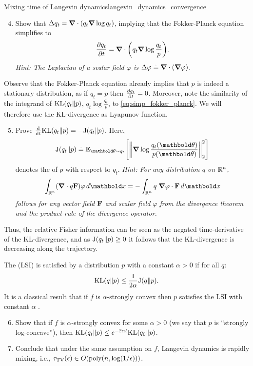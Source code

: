 \begin{nexercise}{Mixing time of Langevin dynamics}{langevin_dynamics_convergence}
  \begin{enumerate}
    \setcounter{enumi}{3}
    \item Show that $\lapl q_t = \dive (q_t \grad \log q_t)$, implying that the Fokker-Planck equation simplifies to \begin{align}
      \pdv{q_t}{t} = \dive \parentheses*{q_t \grad \log \frac{q_t}{p}}. \label{eq:simp_fokker_planck}
    \end{align}
    \textit{Hint: The Laplacian of a scalar field $\varphi$ is $\lapl \varphi \defeq \dive (\grad \varphi)$.}
  \end{enumerate}
  Observe that the Fokker-Planck equation already implies that $p$ is indeed a stationary distribution, as if $q_t = p$ then $\pdv{q_t}{t} = 0$.
  Moreover, note the similarity of the integrand of $\KL{q_t}{p}$, $q_t \log \frac{q_t}{p}$, to \cref{eq:simp_fokker_planck}.
  We will therefore use the KL-divergence as Lyapunov function.
  \begin{enumerate}
    \setcounter{enumi}{4}
    \item Prove $\odv{}{t} \KL{q_t}{p} = - \Fisher{q_t}{p}$.
    Here, \begin{align}
      \Fisher{q_t}{p} \defeq \E[\vtheta \sim q_t]{\norm{\grad \log \frac{q_t(\vtheta)}{p(\vtheta)}}_2^2}
    \end{align} denotes the  of $p$ with respect to $q_t$.
    \textit{Hint: For any distribution $q$ on $\mathbb{R}^n$, \begin{align}
      \int_{\R^n} (\dive q \vF) \varphi \,d \vx = - \int_{\R^n} q \; \grad \varphi \cdot \vF \,d \vx \label{eq:divergence_theorem_hint}
    \end{align} follows for any vector field $\mathbf{F}$ and scalar field $\varphi$ from the divergence theorem and the product rule of the divergence operator.}
  \end{enumerate}
  Thus, the relative Fisher information can be seen as the negated time-derivative of the KL-divergence, and as $\Fisher{q_t}{p} \geq 0$ it follows that the KL-divergence is decreasing along the trajectory.

  The  (LSI) is satisfied by a distribution $p$ with a constant $\alpha > 0$ if for all $q$: \begin{align}
    \KL{q}{p} \leq \frac{1}{2 \alpha} \Fisher{q}{p}.
  \end{align}
  It is a classical result that if $f$ is $\alpha$-strongly convex then $p$ satisfies the LSI with constant $\alpha$ \citep{bakry2006diffusions}.
  \begin{enumerate}
    \setcounter{enumi}{5}
    \item Show that if $f$ is $\alpha$-strongly convex for some $\alpha > 0$ (we say that $p$ is ``strongly log-concave''), then $\KL{q_t}{p} \leq e^{-2 \alpha t} \KL{q_0}{p}$.
    \item Conclude that under the same assumption on $f$, Langevin dynamics is rapidly mixing, i.e., $\tau_{\mathrm{TV}}(\epsilon) \in \BigO{\mathrm{poly}(n, \log(1 / \epsilon))}$.
  \end{enumerate}


\end{nexercise}
